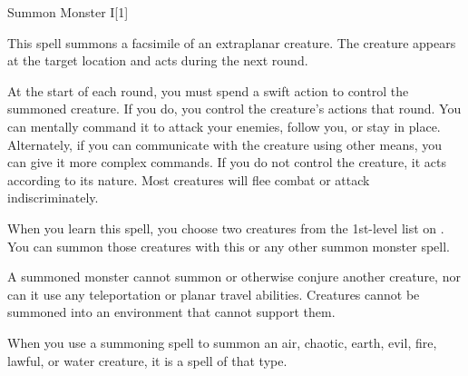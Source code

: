 \begin{spellsection}{Summon Monster I}[1]\hypertarget{spell:summon monster}{}
    \begin{spellheader}
    \end{spellheader}
    \begin{spellcontent}
        \begin{spelltargetinginfo}
        \end{spelltargetinginfo}
        \begin{spelleffects}
            \spelleffect This spell summons a facsimile of an extraplanar creature.
            The creature appears at the target location and acts during the next round.

            At the start of each round, you must spend a swift action to control the summoned creature.
            If you do, you control the creature's actions that round.
            You can mentally command it to attack your enemies, follow you, or stay in place.
            Alternately, if you can communicate with the creature using other means, you can give it more complex commands.
            If you do not control the creature, it acts according to its nature.
            Most creatures will flee combat or attack indiscriminately.

            \par When you learn this spell, you choose two creatures from the 1st-level list on . You can summon those creatures with this or any other summon monster spell.
            \par A summoned monster cannot summon or otherwise conjure another creature, nor can it use any teleportation or planar travel abilities. Creatures cannot be summoned into an environment that cannot support them.
            \par When you use a summoning spell to summon an air, chaotic, earth, evil, fire, lawful, or water creature, it is a spell of that type.
            \spelldur \durshort \dismissable
        \end{spelleffects}
    \end{spellcontent}
    \begin{spellfooter}
        \miscastexplode
    \end{spellfooter}
\end{spellsection}

